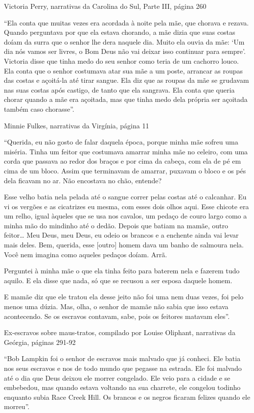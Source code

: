 Victoria Perry, narrativas da Carolina do Sul, Parte III, página 260

``Ela conta que muitas vezes era acordada à noite pela mãe, que chorava
e rezava. Quando perguntava por que ela estava chorando, a mãe dizia que
suas costas doíam da surra que o senhor lhe dera naquele dia. Muito ela
ouvia da mãe: `Um dia nós vamos ser livres, o Bom Deus não vai deixar
isso continuar para sempre'. Victoria disse que tinha medo do seu senhor
como teria de um cachorro louco. Ela conta que o senhor costumava atar
sua mãe a um poste, arrancar as roupas das costas e açoitá-la até tirar
sangue. Ela diz que as roupas da mãe se grudavam nas suas costas após
castigo, de tanto que ela sangrava. Ela conta que queria chorar quando a
mãe era açoitada, mas que tinha medo dela própria ser açoitada também
caso chorasse''.

Minnie Fulkes, narrativas da Virgínia, página 11

``Querida, eu não gosto de falar daquela época, porque minha mãe sofreu
uma miséria. Tinha um feitor que costumava amarrar minha mãe no celeiro,
com uma corda que passava ao redor dos braços e por cima da cabeça, com
ela de pé em cima de um bloco. Assim que terminavam de amarrar, puxavam
o bloco e os pés dela ficavam no ar. Não encostava no chão, entende?

Esse velho batia nela pelada até o sangue correr pelas costas até o
calcanhar. Eu vi os vergões e as cicatrizes eu mesma, com esses dois
olhos aqui. Esse chicote era um relho, igual àqueles que se usa nos
cavalos, um pedaço de couro largo como a minha mão do mindinho até o
dedão. Depois que batiam na mamãe, outro feitor\ldots{} Meu Deus, meu
Deus, eu odeio os brancos e a enchente ainda vai levar mais deles. Bem,
querida, esse {[}outro{]} homem dava um banho de salmoura nela. Você nem
imagina como aqueles pedaços doíam. Arrã.

Perguntei à minha mãe o que ela tinha feito para baterem nela e fazerem
tudo aquilo. E ela disse que nada, só que se recusou a ser esposa
daquele homem.

E mamãe diz que ele tratou ela desse jeito não foi uma nem duas vezes,
foi pelo menos uma dúzia. Mas, olha, o senhor de mamãe não sabia que
isso estava acontecendo. Se os escravos contavam, sabe, pois os feitores
matavam eles''.

Ex-escravos sobre maus-tratos, compilado por Louise Oliphant, narrativas
da Geórgia, páginas 291-92

``Bob Lampkin foi o senhor de escravos mais malvado que já conheci. Ele
batia nos seus escravos e nos de todo mundo que pegasse na estrada. Ele
foi malvado até o dia que Deus deixou ele morrer congelado. Ele veio
para a cidade e se embebedou, mas quando estava voltando na sua
charrete, ele congelou todinho enquanto subia Race Creek Hill. Os
brancos e os negros ficaram felizes quando ele morreu''.

